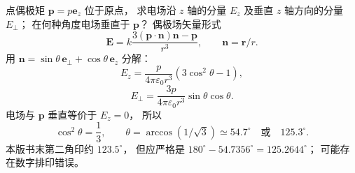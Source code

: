 点偶极矩 $\bm p=p\bm e_z$ 位于原点，
求电场沿 $z$ 轴的分量 $E_z$
及垂直 $z$ 轴方向的分量 $E_\perp$；
在何种角度电场垂直于 $\bm p$？
\exsolution
偶极场矢量形式
\[
\bm E=k\frac{3(\bm p\cdot\bm n)\bm n-\bm p}{r^3},
\qquad\bm n=\bm r/r.
\]
用
$\bm n=\sin\theta\,\bm e_\perp+
\cos\theta\,\bm e_z$ 分解：
\[
\boxed{E_z=\frac{p}{4\pi\varepsilon_0r^3}
(3\cos^2\theta-1)},
\]
\[
\boxed{E_\perp=\frac{3p}{4\pi\varepsilon_0r^3}
\sin\theta\cos\theta}.
\]
电场与 $\bm p$ 垂直等价于 $E_z=0$，
所以
\[
\cos^2\theta=\frac13,\qquad
\boxed{\theta=\arccos(1/\sqrt3)\simeq54.7^\circ
\quad\text{或}\quad125.3^\circ}.
\]
\excheck 本版书末第二角印约 $123.5^\circ$，
但应严格是
$180^\circ-54.7356^\circ=125.2644^\circ$；
可能存在数字排印错误。
